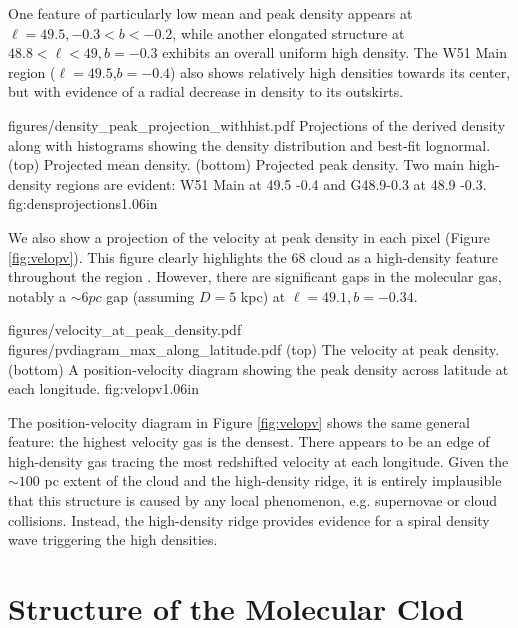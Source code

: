 One feature of particularly low mean and peak density appears at $\ell=49.5,
-0.3<b<-0.2$, while another elongated structure at $48.8<\ell<49, b=-0.3$
exhibits an overall uniform high density.  The W51 Main region
($\ell=49.5$,$b=-0.4$) also shows relatively high densities towards its center,
but with evidence of a radial decrease in density to its outskirts.


            {figures/density_peak_projection_withhist.pdf}
{Projections of the derived density along with histograms
showing the density distribution and best-fit lognormal.
(top) Projected mean density.
(bottom) Projected peak density.
Two main high-density regions are evident: W51 Main at 49.5 -0.4 and G48.9-0.3 at 48.9 -0.3.}
{fig:densprojections}{1.0}{6in}

We also show a projection of the velocity at peak density in each pixel (Figure
\ref{fig:velopv}).  This figure clearly highlights the 68 \kms cloud as a
high-density feature throughout the region \citep{Carpenter1998a}.  However,
there are significant gaps in the molecular gas, notably a $\sim6 pc$ gap
(assuming $D=5$ kpc) at $\ell=49.1, b=-0.34$.

\FigureTwoAA
{figures/velocity_at_peak_density.pdf}
{figures/pvdiagram_max_along_latitude.pdf}
{(top) The velocity at peak density.
 (bottom) A position-velocity diagram showing the peak density across latitude
 at each longitude.
}
{fig:velopv}{1.0}{6in}

The position-velocity diagram in Figure \ref{fig:velopv} shows the same general
feature: the highest velocity gas is the densest.  There appears to be an edge
of high-density gas tracing the most redshifted velocity at each longitude.
Given the $\sim100$ pc extent of the cloud and the high-density ridge, it is
entirely implausible that this structure is caused by any local phenomenon,
e.g. supernovae or cloud collisions.  Instead, the high-density ridge provides
evidence for a spiral density wave triggering the high densities.

\section{Structure of the Molecular Clod}




